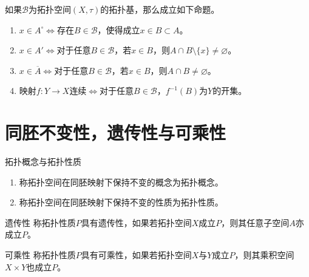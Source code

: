 \documentclass[lang = cn, scheme = chinese, thmcnt = section, usesamecnt]{elegantbook}
\newcommand{\sub}{\subset}             %
\begin{document}
\begin{theorem}
	如果$\mathscr{B}$为拓扑空间$(X,\tau)$的拓扑基，那么成立如下命题。
	\begin{enumerate}
		\item $x\in A^\circ\iff$存在$B\in\mathscr{B}$，使得成立$x\in B\sub A$。
		\item $x\in A'\iff$对于任意$B\in\mathscr{B}$，若$x\in B$，则$A\cap B\setminus\{x\}\ne\varnothing$。
		\item $x\in \overline{A}\iff$对于任意$B\in\mathscr{B}$，若$x\in B$，则$A\cap B\ne\varnothing$。
		\item 映射$f:Y\to X$连续$\iff$对于任意$B\in\mathscr{B}$，$f^{-1}(B)$为$Y$的开集。
	\end{enumerate}
\end{theorem}

\section{同胚不变性，遗传性与可乘性}

\begin{definition}{拓扑概念与拓扑性质}
	\begin{enumerate}
		\item 称拓扑空间在同胚映射下保持不变的概念为拓扑概念。
		\item 称拓扑空间在同胚映射下保持不变的性质为拓扑性质。
	\end{enumerate}
\end{definition}

\begin{definition}{遗传性}
	称拓扑性质$P$具有遗传性，如果若拓扑空间$X$成立$P$，则其任意子空间$A$亦成立$P$。
\end{definition}

\begin{definition}{可乘性}
	称拓扑性质$P$具有可乘性，如果若拓扑空间$X$与$Y$成立$P$，则其乘积空间$X\times Y$也成立$P$。
\end{definition}
\end{document}
